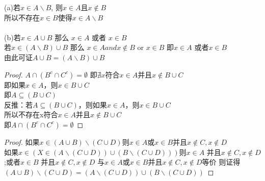 \documentclass[a4paper, justified]{tufte-handout}
\begin{document}
\begin{problem}[UD Problem 7.14]
\end{problem}
\begin{solution}
  (a)若$x \in A \backslash B$, 则$x \in A$且$x \notin B$\\
  所以不存在$x \in B$使得$x \in A \backslash B$\\
  \\
  (b)若$x \in A\cup B$ 那么 $x \in A$ 或者 $x \in B$\\
  若$x\in (A \backslash B) \cup B$ 那么 $x \in A and x\notin B$ or $x \in B$ 即$x \in A$ 或者$x \in B$\\
  由此可证$A\cup B = (A \backslash B) \cup B$

\end{solution}

\begin{problem}[UD Problem 7.19]
\end{problem}

\begin{proof}
  $A\cap (B^c \cap C^c) = \emptyset$ 即$\nexists x$符合$x \in A$并且$x \notin B \cup C$\\
  即如果$x \in A$，则$x \in B \cup C$\\
  即$A \subseteq (B \cup C)$\\
  反推：若$A \subseteq (B \cup C)$，则如果$x \in A$，则$x \in B \cup C$\\
  所以不存在x符合$x \in A$并且$x \notin B \cup C$　\\
  即$A\cap (B^c \cap C^c) = \emptyset$
\end{proof}

\begin{problem}[UD Problem 7.20]
\end{problem}

\begin{proof}
  如果$x \in (A \cup B)\backslash (C \cup D) $则$x \in A$或$x \in B$并且$x \notin C, x \notin D$\\
  如果$x\in(X \in (A \backslash (C \cup D))\cup (B \backslash (C \cup D)))$则$x \in A$ 并且$x \notin C, x \notin D$;或者$x \in B$ 并且$x \notin C, x \notin D$
  与$x \in A$或$x \in B$并且$x \notin C, x \notin D$等价
  则证得$(A \cup B)\backslash (C \cup D) = (A \backslash (C \cup D))\cup (B \backslash (C \cup D))$
\end{proof}

\begin{problem}[UD Problem 8.1 (a, b)]
\end{problem}
\end{document}
